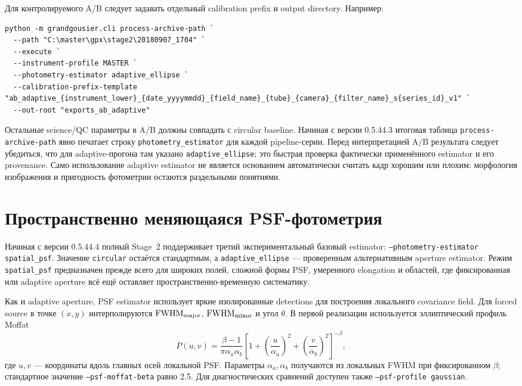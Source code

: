 Для контролируемого A/B следует задавать отдельный calibration prefix и output directory. Например:
\begin{lstlisting}
python -m grandgousier.cli process-archive-path `
  --path "C:\master\gpx\stage2\20180907_1704" `
  --execute `
  --instrument-profile MASTER `
  --photometry-estimator adaptive_ellipse `
  --calibration-prefix-template "ab_adaptive_{instrument_lower}_{date_yyyymmdd}_{field_name}_{tube}_{camera}_{filter_name}_s{series_id}_v1" `
  --out-root "exports_ab_adaptive"
\end{lstlisting}
Остальные science/QC параметры в A/B должны совпадать с circular baseline. Начиная с
версии 0.5.44.3 итоговая таблица \texttt{process-archive-path} явно печатает строку
\texttt{photometry\_estimator} для каждой pipeline-серии. Перед интерпретацией A/B результата
следует убедиться, что для adaptive-прогона там указано \texttt{adaptive\_ellipse}; это
быстрая проверка фактически применённого estimator и его provenance. Само использование
adaptive estimator не является основанием автоматически считать кадр хорошим или плохим:
морфология изображения и пригодность фотометрии остаются раздельными понятиями.

\section{Пространственно меняющаяся PSF-фотометрия}
\label{sec:spatial-psf-photometry}

Начиная с версии 0.5.44.4 полный Stage~2 поддерживает третий экспериментальный базовый
estimator: \texttt{--photometry-estimator spatial\_psf}. Значение \texttt{circular} остаётся
стандартным, а \texttt{adaptive\_ellipse} --- проверенным альтернативным aperture estimator.
Режим \texttt{spatial\_psf} предназначен прежде всего для широких полей, сложной формы PSF,
умеренного elongation и областей, где фиксированная или adaptive aperture всё ещё оставляет
пространственно-временную систематику.

Как и adaptive aperture, PSF estimator использует яркие изолированные detections для построения
локального covariance field. Для forced source в точке $(x,y)$ интерполируются
$\mathrm{FWHM}_{\rm major}$, $\mathrm{FWHM}_{\rm minor}$ и угол $\theta$. В первой реализации
используется эллиптический профиль Moffat
\begin{equation}
 P(u,v)=\frac{\beta-1}{\pi\alpha_a\alpha_b}
 \left[1+\left(\frac{u}{\alpha_a}\right)^2+
 \left(\frac{v}{\alpha_b}\right)^2\right]^{-\beta},
\end{equation}
где $u,v$ --- координаты вдоль главных осей локальной PSF. Параметры $\alpha_a,\alpha_b$
получаются из локальных FWHM при фиксированном $\beta$; стандартное значение
\texttt{--psf-moffat-beta} равно 2.5. Для диагностических сравнений доступен также
\texttt{--psf-profile gaussian}.

